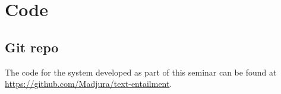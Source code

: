 \chapter{Code}
\label{chapter:code}
\section{Git repo}
The code for the system developed as part of this seminar can be found at \\
\url{https://github.com/Madjura/text-entailment}.
